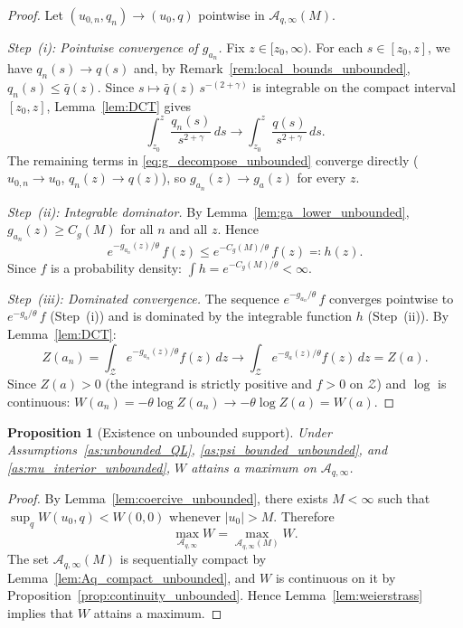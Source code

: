\documentclass[12pt,a4paper]{article}
\theoremstyle{definition}
\theoremstyle{plain}
\newtheorem{proposition}{Proposition}[section]
\theoremstyle{remark}
\newcommand{\zlow}{z_{\scriptscriptstyle 0}}
\newcommand{\calZ}{\mathcal{Z}}
\begin{document}
\begin{proof}
Let $(u_{0,n},q_n) \to (u_0,q)$ pointwise in
$\mathcal{A}_{q,\infty}(M)$.

\emph{Step~(i): Pointwise convergence of $g_{a_n}$.}
Fix $z \in [\zlow,\infty)$.  For each
$s \in [\zlow,z]$, we have $q_n(s) \to q(s)$ and, by
Remark~\ref{rem:local_bounds_unbounded},
$q_n(s) \leq \bar q(z)$.  Since
$s \mapsto \bar q(z)\,s^{-(2+\gamma)}$ is integrable on the
compact interval $[\zlow,z]$, Lemma~\ref{lem:DCT} gives
\[
  \int_{\zlow}^z \frac{q_n(s)}{s^{2+\gamma}}\,ds
  \to
  \int_{\zlow}^z \frac{q(s)}{s^{2+\gamma}}\,ds.
\]
The remaining terms in \eqref{eq:g_decompose_unbounded}
converge directly ($u_{0,n} \to u_0$, $q_n(z) \to q(z)$),
so $g_{a_n}(z) \to g_a(z)$ for every $z$.

\emph{Step~(ii): Integrable dominator.}
By Lemma~\ref{lem:ga_lower_unbounded},
$g_{a_n}(z) \geq C_g(M)$ for all $n$ and all $z$.  Hence
\[
  e^{-g_{a_n}(z)/\theta}\,f(z)
  \leq e^{-C_g(M)/\theta}\,f(z)
  \eqqcolon h(z).
\]
Since $f$ is a probability density:
$\int h = e^{-C_g(M)/\theta} < \infty$.

\emph{Step~(iii): Dominated convergence.}
The sequence $e^{-g_{a_n}/\theta}\,f$ converges pointwise
to $e^{-g_a/\theta}\,f$ (Step~(i)) and is dominated by the
integrable function $h$ (Step~(ii)).  By
Lemma~\ref{lem:DCT}:
\[
  Z(a_n) = \int_{\calZ} e^{-g_{a_n}(z)/\theta}f(z)\,dz
  \longrightarrow
  \int_{\calZ} e^{-g_a(z)/\theta}f(z)\,dz = Z(a).
\]
Since $Z(a) > 0$ (the integrand is strictly positive and
$f > 0$ on $\calZ$) and $\log$ is continuous:
$W(a_n) = -\theta\log Z(a_n) \to -\theta\log Z(a) = W(a)$.
\end{proof}

\begin{proposition}[Existence on unbounded support]
\label{prop:existence_unbounded}
Under Assumptions~\ref{as:unbounded_QL},
\ref{as:psi_bounded_unbounded}, and
\ref{as:mu_interior_unbounded}, $W$ attains a maximum on
$\mathcal{A}_{q,\infty}$.
\end{proposition}

\begin{proof}
By Lemma~\ref{lem:coercive_unbounded}, there exists
$M < \infty$ such that
$\sup_q W(u_0,q) < W(0,0)$ whenever $|u_0| > M$.
Therefore
\[
  \max_{\mathcal{A}_{q,\infty}} W
  = \max_{\mathcal{A}_{q,\infty}(M)} W.
\]
The set $\mathcal{A}_{q,\infty}(M)$ is sequentially compact
by Lemma~\ref{lem:Aq_compact_unbounded}, and $W$ is
continuous on it by
Proposition~\ref{prop:continuity_unbounded}.  Hence
Lemma~\ref{lem:weierstrass} implies that $W$ attains a
maximum.
\end{proof}
\end{document}
